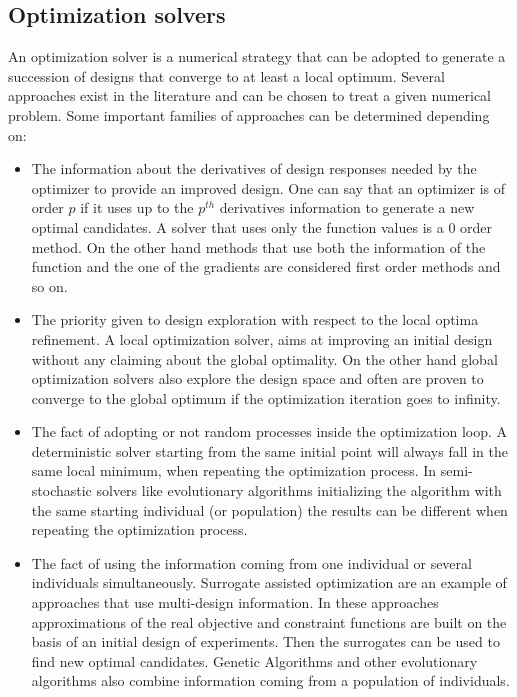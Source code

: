 \subsection {Optimization solvers}
An optimization solver is a numerical strategy that can be adopted to generate a succession of designs that converge to at least a local optimum. Several approaches exist in the literature and can be chosen to treat a given numerical problem. Some important families of approaches can be determined depending on:
\begin{itemize}
\item The information about the derivatives of design responses needed by the optimizer to provide an improved design. One can say that an optimizer is of order $p$ if it uses up to the $p^{th}$ derivatives information to generate a new optimal candidates. A solver that uses only the function values is a 0 order method. On the other hand methods that use both the information of the function and the one of the gradients are considered first order methods and so on.
\item The priority given to design exploration with respect to the local optima refinement. A local optimization solver, aims at improving an initial design without any claiming about the global optimality. On the other hand global optimization solvers also explore the design space and often are proven to converge to the global optimum if the optimization iteration goes to infinity. 
\item The fact of adopting or not random processes inside the optimization loop. A deterministic solver starting from the same initial point will always fall in the same local minimum, when repeating the optimization process. In semi-stochastic solvers like evolutionary algorithms \cite{simon2013evolutionary} initializing the algorithm with the same starting individual (or population) the results can be different when repeating the optimization process. 
\item The fact of using the information coming from one individual or several individuals simultaneously. Surrogate assisted optimization \cite{forrester2008engineering} are an example of approaches that use multi-design information. In these approaches approximations of the real objective and constraint functions are built on the basis of an initial design of experiments. Then the surrogates can be used to find new optimal candidates. Genetic Algorithms and other evolutionary algorithms also combine information coming from a population of individuals.
\end{itemize}

